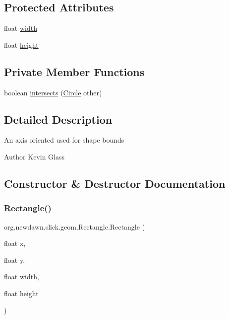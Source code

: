 \subsection*{Protected Attributes}
\begin{DoxyCompactItemize}
\item 
float \mbox{\hyperlink{classorg_1_1newdawn_1_1slick_1_1geom_1_1_rectangle_a967e1823f62daf45abb142779d1be62d}{width}}
\item 
float \mbox{\hyperlink{classorg_1_1newdawn_1_1slick_1_1geom_1_1_rectangle_a3bd010fdce636fc11ed0e0ad4d4b4a0a}{height}}
\end{DoxyCompactItemize}
\subsection*{Private Member Functions}
\begin{DoxyCompactItemize}
\item 
boolean \mbox{\hyperlink{classorg_1_1newdawn_1_1slick_1_1geom_1_1_rectangle_a84727b0f646bd63fcb232ef88faef412}{intersects}} (\mbox{\hyperlink{classorg_1_1newdawn_1_1slick_1_1geom_1_1_circle}{Circle}} other)
\end{DoxyCompactItemize}


\subsection{Detailed Description}
An axis oriented used for shape bounds

\begin{DoxyAuthor}{Author}
Kevin Glass 
\end{DoxyAuthor}


\subsection{Constructor \& Destructor Documentation}
\mbox{\label{classorg_1_1newdawn_1_1slick_1_1geom_1_1_rectangle_a27f83e29df8fa2df8988cd649ef87d47}} 
\subsubsection{\texorpdfstring{Rectangle()}{Rectangle()}}
{\footnotesize\ttfamily org.\+newdawn.\+slick.\+geom.\+Rectangle.\+Rectangle (\begin{DoxyParamCaption}\item[{float}]{x,  }\item[{float}]{y,  }\item[{float}]{width,  }\item[{float}]{height }\end{DoxyParamCaption})\hspace{0.3cm}{\ttfamily [inline]}}


